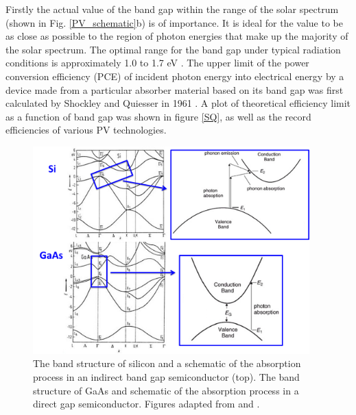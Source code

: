 \documentclass[11pt, twoside]{report}
\begin{document}
Firstly the actual value of the band gap within the range of the solar spectrum (shown in Fig. \ref{PV_schematic}b) is of importance. It is ideal for the value to be as close as possible to the region of photon energies that make up the majority of the solar spectrum. The optimal range for the band gap under typical radiation conditions is approximately 1.0 to 1.7 eV \cite{PV_E_range}. The upper limit of the power conversion efficiency (PCE) of incident photon energy into electrical energy by a device made from a particular absorber material based on its band gap was first calculated by Shockley and Quiesser in 1961 \cite{SQ_1961}. A plot of theoretical efficiency limit as a function of band gap was shown in figure \ref{SQ}, as well as the record efficiencies of various PV technologies.

\begin{figure}[h!]
  \centering
    \includegraphics[width=0.95\textwidth]{figures/Si_and_GaAs.png}
    \caption{The band structure of silicon and a schematic of the absorption process in an indirect band gap semiconductor (top). The band structure of GaAs and schematic of the absorption process in a direct gap semiconductor. Figures adapted from  and .}
  \label{Si_and_GaAs}
\end{figure}
\end{document}
